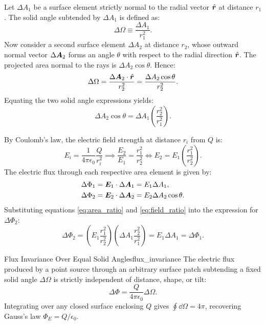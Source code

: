 Let $\Delta A_1$ be a surface element strictly normal to the radial vector $\hat{\vb*{r}}$ at distance $r_1$. The solid angle subtended by $\Delta A_1$ is defined as:
\begin{equation}
    \Delta\Omega \equiv \frac{\Delta A_1}{r_1^2}.
\end{equation}
Now consider a second surface element $\Delta A_2$ at distance $r_2$, whose outward normal vector $\Delta \vb*{A}_2$ forms an angle $\theta$ with respect to the radial direction $\hat{\vb*{r}}$. The projected area normal to the rays is $\Delta A_2 \cos\theta$. Hence:
\begin{equation}
    \Delta\Omega = \frac{\Delta\vb*{A}_2 \cdot \hat{\vb*{r}}}{r_2^2} = \frac{\Delta A_2 \cos\theta}{r_2^2}.
\end{equation}
Equating the two solid angle expressions yields:
\begin{equation}
    \Delta A_2 \cos\theta = \Delta A_1 \left(\frac{r_2^2}{r_1^2}\right).
    \label{eq:area_ratio}
\end{equation}

By Coulomb's law, the electric field strength at distance $r_i$ from $Q$ is:
\begin{equation}
    E_i = \frac{1}{4\pi\epsilon_0}\frac{Q}{r_i^2} \implies \frac{E_2}{E_1} = \frac{r_1^2}{r_2^2} \iff E_2 = E_1\left(\frac{r_1^2}{r_2^2}\right).
    \label{eq:field_ratio}
\end{equation}
The electric flux through each respective area element is given by:
\begin{align}
    \Delta\Phi_1 &= \vb*{E}_1 \cdot \Delta\vb*{A}_1 = E_1 \Delta A_1, \\
    \Delta\Phi_2 &= \vb*{E}_2 \cdot \Delta\vb*{A}_2 = E_2 \Delta A_2 \cos\theta.
\end{align}
Substituting equations \eqref{eq:area_ratio} and \eqref{eq:field_ratio} into the expression for $\Delta\Phi_2$:
\begin{equation}
    \Delta\Phi_2 = \left( E_1 \frac{r_1^2}{r_2^2} \right) \left( \Delta A_1 \frac{r_2^2}{r_1^2} \right) = E_1 \Delta A_1 = \Delta\Phi_1.
\end{equation}

\begin{theorem}{Flux Invariance Over Equal Solid Angles}{flux_invariance}
The electric flux produced by a point source through an arbitrary surface patch subtending a fixed solid angle $\Delta\Omega$ is strictly independent of distance, shape, or tilt:
\begin{equation}
    \Delta\Phi = \frac{Q}{4\pi\epsilon_0}\Delta\Omega.
\end{equation}
Integrating over any closed surface enclosing $Q$ gives $\oint \dd{\Omega} = 4\pi$, recovering Gauss's law $\Phi_E = Q/\epsilon_0$.
\end{theorem}

